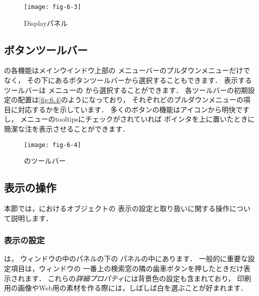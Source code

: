 \begin{figure}[ht]
 \texttt{[image: fig-6-3]}
 \caption{Displayパネル}
 \label{fig:6.3}
\end{figure}


\subsection{ボタンツールバー}
\label{ssec:6.1.4}
の各機能はメインウインドウ上部の
メニューバーのプルダウンメニューだけでなく，
その下にあるボタンツールバーから選択することもできます．
表示するツールバーは
%
%
メニューの
%
%
から選択することができます．
各ツールバーの初期設定の配置は\autoref{fig:6.4}のようになっており，
それぞれどのプルダウンメニューの項目に対応するかを示しています．
多くのボタンの機能はアイコンから明快ですし，
%
%
メニューのtooltipsにチェックがされていれば
ポインタを上に置いたときに簡潔な注を表示させることができます．


\begin{figure}[ht]
 \texttt{[image: fig-6-4]}
 \caption{のツールバー}
 \label{fig:6.4}
\end{figure}


\subsection{表示の操作}
\label{ssec:6.1.5}
本節では，におけるオブジェクトの
表示の設定と取り扱いに関する操作について説明します．

\subsubsection{表示の設定}
\label{sssec:6.1.5.1}
%
%
は，
ウィンドウの中のパネルの下の
パネルの中にあります．
一般的に重要な設定項目は，ウィンドウの
一番上の検索窓の隣の歯車ボタンを押したときだけ表示されます．
これらの\emph{詳細プロパティ}には背景色の設定も含まれており，
印刷用の画像やWeb用の素材を作る際には，しばしば白を選ぶことが好まれます．


